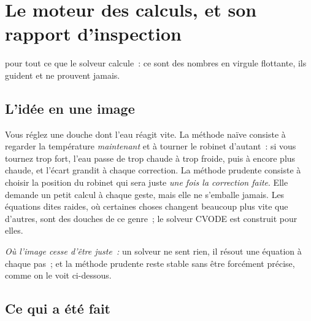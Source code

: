 \chapter[Le moteur des calculs]{Le moteur des calculs, et son rapport d'inspection}

\noindent{} pour tout ce que le solveur calcule~: ce sont des nombres en virgule flottante, ils guident et
ne prouvent jamais.

\section*{L'idée en une image}

\begin{analogie}
Vous réglez une douche dont l'eau réagit vite. La méthode naïve consiste à regarder la température \emph{maintenant}
et à tourner le robinet d'autant~: si vous tournez trop fort, l'eau passe de trop chaude à trop froide, puis à
encore plus chaude, et l'écart grandit à chaque correction. La méthode prudente consiste à choisir la position du
robinet qui sera juste \emph{une fois la correction faite}. Elle demande un petit calcul à chaque geste, mais elle ne
s'emballe jamais. Les équations dites \og raides\fg, où certaines choses changent beaucoup plus vite que d'autres,
sont des douches de ce genre~; le solveur CVODE est construit pour elles.

\emph{Où l'image cesse d'être juste~:} un solveur ne \og sent\fg{} rien, il résout une équation à chaque pas~; et la
méthode prudente reste stable sans être forcément précise, comme on le voit ci-dessous.
\end{analogie}

\section*{Ce qui a été fait}

